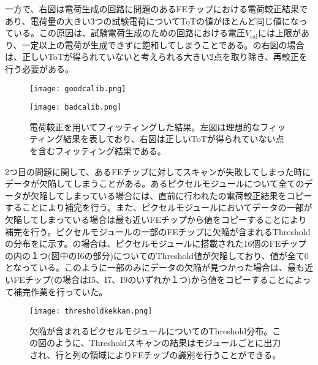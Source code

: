 一方で、右図は電荷生成の回路に問題のあるFEチップにおける電荷較正結果であり、電荷量の大きい3つの試験電荷についてToTの値がほとんど同じ値になっている。この原因は、試験電荷生成のための回路における電圧$V_\mathrm{cal}$には上限があり、一定以上の電荷が生成できずに飽和してしまうことである。の右図の場合は、正しいToTが得られていないと考えられる大きい2点を取り除き、再較正を行う必要がある。

\begin{figure}[tbp]
  \begin{minipage}[b]{0.5\linewidth}
    \centering
    \texttt{[image: goodcalib.png]}
  \end{minipage}
  \begin{minipage}[b]{0.5\linewidth}
    \centering
    \texttt{[image: badcalib.png]}
  \end{minipage}
  \caption[電荷較正を用いてフィッティングした結果]{電荷較正を用いてフィッティングした結果。左図は理想的なフィッティング結果を表しており、右図は正しいToTが得られていない点を含むフィッティング結果である。}
  \label{fig:calibhikaku}
\end{figure}

2つ目の問題に関して、あるFEチップに対してスキャンが失敗してしまった時にデータが欠陥してしまうことがある。あるピクセルモジュールについて全てのデータが欠陥してしまっている場合には、直前に行われたの電荷較正結果をコピーすることにより補完を行う。また、ピクセルモジュールにおいてデータの一部が欠陥してしまっている場合は最も近いFEチップから値をコピーすることにより補完を行う。ピクセルモジュールの一部のFEチップに欠陥が含まれるThresholdの分布をに示す。の場合は、ピクセルモジュールに搭載された16個のFEチップの内の１つ(図中のI6の部分)についてのThreshold値が欠陥しており、値が全て0となっている。このように一部のみにデータの欠陥が見つかった場合は、最も近いFEチップ(の場合はI5、I7、I9のいずれか１つ)から値をコピーすることによって補完作業を行っていた。

\begin{figure}[tbp]
  \centering
  \texttt{[image: thresholdkekkan.png]}
  \caption[欠陥が含まれるピクセルモジュールについてのThreshold分布]{欠陥が含まれるピクセルモジュールについてのThreshold分布。この図のように、Thresholdスキャンの結果はモジュールごとに出力され、行と列の領域によりFEチップの識別を行うことができる。}
  \label{fig:thresholdkekkan}
\end{figure}


